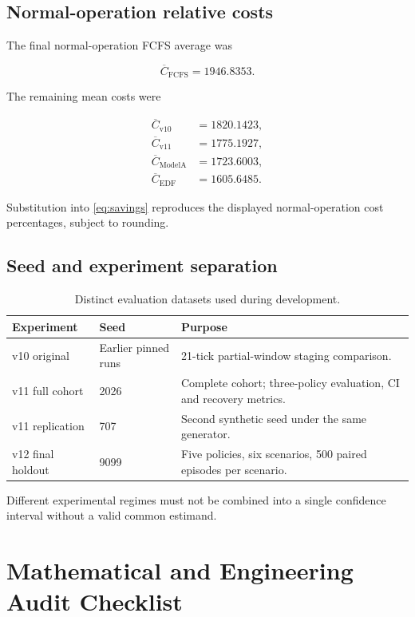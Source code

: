 \documentclass[10pt,a4paper]{article}
\theoremstyle{plain}
\theoremstyle{definition}
\theoremstyle{remark}
\begin{document}
\subsection{Normal-operation relative costs}

The final normal-operation
FCFS average was

\[
\overline C_{\mathrm{FCFS}}
=
1946.8353.
\]

The remaining mean costs were

\begin{align*}
\overline C_{\mathrm{v10}} &=1820.1423,\\
\overline C_{\mathrm{v11}} &=1775.1927,\\
\overline C_{\mathrm{ModelA}} &=1723.6003,\\
\overline C_{\mathrm{EDF}} &=1605.6485.
\end{align*}

Substitution into
\eqref{eq:savings}
reproduces the displayed
normal-operation cost percentages,
subject to rounding.

\subsection{Seed and experiment separation}

\begin{table}[!htbp]
\centering
\caption{
Distinct evaluation datasets
used during development.
}
\small
\begin{tabularx}{\linewidth}{@{}p{25mm}p{23mm}L@{}}
\toprule
Experiment &
Seed &
Purpose \\
\midrule
v10 original &
Earlier pinned runs &
21-tick partial-window
staging comparison. \\
v11 full cohort &
2026 &
Complete cohort;
three-policy evaluation,
CI and recovery metrics. \\
v11 replication &
707 &
Second synthetic seed
under the same generator. \\
v12 final holdout &
9099 &
Five policies,
six scenarios,
500 paired episodes per scenario. \\
\bottomrule
\end{tabularx}
\end{table}

Different experimental regimes
must not be combined into
a single confidence interval
without a valid common estimand.

\section{Mathematical and Engineering Audit Checklist}
\end{document}
